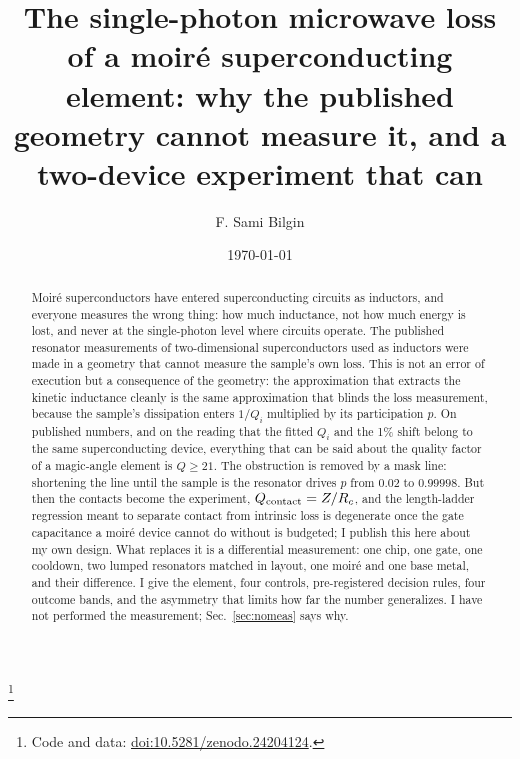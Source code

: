 \documentclass[aps,prb,reprint,superscriptaddress,longbibliography]{revtex4-2}
\newcommand{\zenododoi}{10.5281/zenodo.24204124}
\begin{document}
\title{The single-photon microwave loss of a moir\'e superconducting
element: why the published geometry cannot measure it, and a two-device
experiment that can}

\author{F. Sami Bilgin}
\thanks{\protect\raggedright Code and data: \href{https://doi.org/\zenododoi}{doi:\zenododoi}.}

\date{\today}

\begin{abstract}
Moir\'e superconductors have entered superconducting circuits as
inductors, and everyone measures the wrong thing: how much inductance,
not how much energy is lost, and never at the single-photon level where
circuits operate. The published resonator measurements of
two-dimensional superconductors used as inductors were made in a
geometry that cannot measure the sample's own loss. This is not an error
of execution but a consequence of the geometry: the approximation that
extracts the kinetic inductance cleanly is the same approximation that
blinds the loss measurement, because the sample's dissipation enters
$1/Q_i$ multiplied by its participation $p$. On published numbers, and
on the reading that the fitted $Q_i$ and the 1\% shift belong to the
same superconducting device, everything that can be said about the
quality factor of a magic-angle element is $Q \geq 21$. The obstruction is removed by a mask line:
shortening the line until the sample is the resonator drives $p$ from
$0.02$ to $0.99998$. But then the contacts become the experiment,
$Q_{\rm contact} = Z/R_c$, and the length-ladder regression meant to
separate contact from intrinsic loss is degenerate once the gate
capacitance a moir\'e device cannot do without is budgeted; I publish
this here about my own design. What replaces it is a differential
measurement: one chip, one gate, one cooldown, two lumped resonators
matched in layout, one moir\'e and one base metal, and their difference. I give
the element, four controls, pre-registered decision rules, four outcome
bands, and the asymmetry that limits how far the number generalizes. I
have not performed the measurement; Sec.~\ref{sec:nomeas} says why.
\end{abstract}

\maketitle

\end{document}
